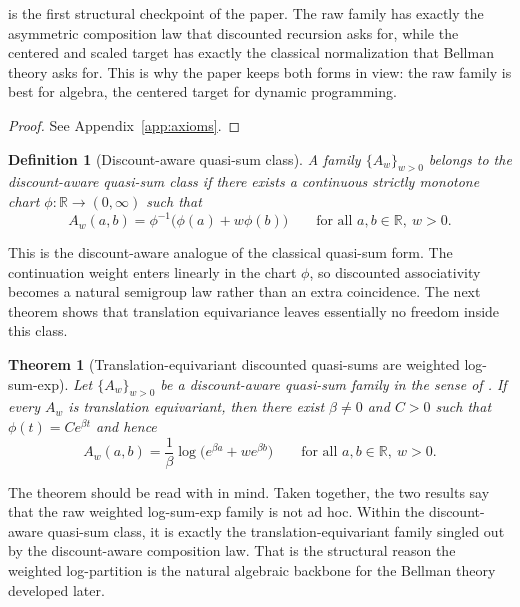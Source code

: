 \documentclass{article}
\newtheorem{theorem}{Theorem}[section]
\newtheorem{definition}[definition]{Definition}
\theoremstyle{remark}
\newcommand{\R}{\mathbb{R}}
\begin{document}
 is the first structural checkpoint of the paper.
The raw family has exactly the asymmetric composition law that discounted recursion asks for, while the centered and scaled target has exactly the classical normalization that Bellman theory asks for.
This is why the paper keeps both forms in view: the raw family is best for algebra, the centered target for dynamic programming.

\begin{proof}
See Appendix~\ref{app:axioms}.
\end{proof}

\begin{definition}[Discount-aware quasi-sum class]
\label{def:discounted-quasi-sum}
A family $\{A_w\}_{w>0}$ belongs to the \emph{discount-aware quasi-sum class} if there exists a continuous strictly monotone chart $\phi:\R\to(0,\infty)$ such that
\begin{equation}
A_w(a,b)=\phi^{-1}\!\bigl(\phi(a)+w\phi(b)\bigr)
\qquad \text{for all } a,b\in\R,\ w>0.
\label{eq:discounted-quasi-sum-def}
\end{equation}
\end{definition}

This is the discount-aware analogue of the classical quasi-sum form.
The continuation weight enters linearly in the chart $\phi$, so discounted associativity becomes a natural semigroup law rather than an extra coincidence.
The next theorem shows that translation equivariance leaves essentially no freedom inside this class.

\begin{theorem}[Translation-equivariant discounted quasi-sums are weighted log-sum-exp]
\label{thm:uniqueness}
Let $\{A_w\}_{w>0}$ be a discount-aware quasi-sum family in the sense of .
If every $A_w$ is translation equivariant, then there exist $\beta\neq 0$ and $C>0$ such that $\phi(t)=Ce^{\beta t}$ and hence
\begin{equation}
A_w(a,b)=\frac{1}{\beta}\log\!\bigl(e^{\beta a}+w e^{\beta b}\bigr)
\qquad \text{for all } a,b\in\R,\ w>0.
\label{eq:discount-aware-quasi-sum}
\end{equation}
\end{theorem}

The theorem should be read with  in mind.
Taken together, the two results say that the raw weighted log-sum-exp family is not ad hoc.
Within the discount-aware quasi-sum class, it is exactly the translation-equivariant family singled out by the discount-aware composition law.
That is the structural reason the weighted log-partition is the natural algebraic backbone for the Bellman theory developed later.
\end{document}
